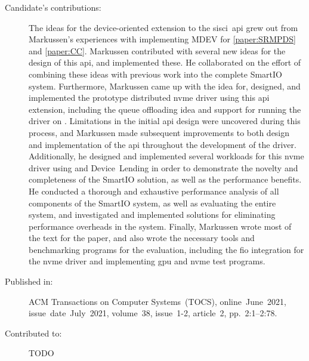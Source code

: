 \begin{description}
	\item[Candidate's contributions:]
		The ideas for the device-oriented extension to the \acrshort{sisci}~\acrshort{api} grew out from Markussen's experiences with implementing MDEV for \cref{paper:SRMPDS} and \cref{paper:CC}.
		Markussen contributed with several new ideas for the design of this \acrshort{api}, and implemented these.
		He collaborated on the effort of combining these ideas with previous work into the complete SmartIO system. 
		Furthermore, Markussen came up with the idea for, designed, and implemented the prototype distributed \acrshort{nvme} driver using this \acrshort{api} extension, 
		including the queue offloading idea and support for running the driver on .
		Limitations in the initial \acrshort{api} design were uncovered during this process, and Markussen made subsequent improvements to both design and implementation of the \acrshort{api} throughout the development of the driver.
		Additionally, he designed and implemented several workloads for this \acrshort{nvme} driver using  and Device~Lending
		in order to demonstrate the novelty and completeness of the SmartIO solution, as well as the performance benefits.
		He conducted a thorough and exhaustive performance analysis of all components of the SmartIO system,
		as well as evaluating the entire system, and investigated and implemented solutions for eliminating performance overheads in the system.
		Finally, Markussen wrote most of the text for the paper, and also wrote the necessary tools and benchmarking programs for the evaluation,
		including the \acrshort{fio} integration for the \acrshort{nvme} driver and implementing \acrshort{gpu} and \acrshort{nvme} test programs.
		

	\item[Published in:]
		ACM Transactions on Computer Systems~(TOCS), 
		online~June~2021,
		issue~date~July~2021, 
		volume~38, issue~1-2, article~2, pp.~2:1--2:78.

	\item[Contributed to:]
		TODO

\end{description}

